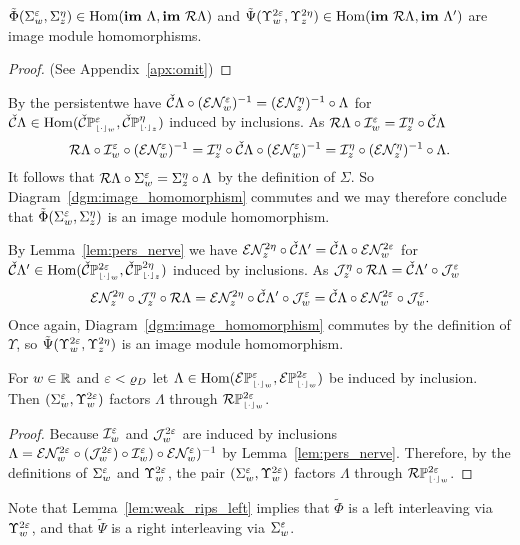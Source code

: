 \begin{lemma}\label{lem:rips_homomorphism_left}
  $\tilde{\Phi}(\Sigma_w^\e,\Sigma_z^\eta)\in\Hom(\im~\Lambda,\im~\rips\Lambda)$ and $\tilde{\Psi}(\Upsilon_w^{2\e},\Upsilon_z^{2\eta})\in\Hom(\im~\rips\Lambda,\im~\Lambda')$ are image module homomorphisms.
\end{lemma}
\begin{proof}
  (See Appendix~\ref{apx:omit})
\end{proof}
\proofatend
  By the persistentwe have $\cech\Lambda\circ (\E\N_w^\e)^{-1} = (\E\N_z^\eta)^{-1}\circ \Lambda$ for $\cech\Lambda\in\Hom(\CPP{w}{\e},\CPP{z}{\eta})$ induced by inclusions.
  As $\rips\Lambda\circ\I_w^\e = \I_z^\eta\circ\cech\Lambda$
  \[ \rips\Lambda\circ \I_w^\e\circ(\E\N_w^\e)^{-1} = \I_z^\eta\circ\cech\Lambda\circ (\E\N_w^\e)^{-1} = \I_z^\eta\circ (\E\N_z^\eta)^{-1}\circ\Lambda.\]
  It follows that $\rips\Lambda\circ\Sigma_w^\e = \Sigma_z^\eta\circ\Lambda$ by the definition of $\Sigma$.
  So Diagram~\ref{dgm:image_homomorphism} commutes and we may therefore conclude that $\tilde{\Phi}(\Sigma_w^\e,\Sigma_z^\eta)$ is an image module homomorphism.

  By Lemma~\ref{lem:pers_nerve} we have $\E\N_z^{2\eta} \circ\cech\Lambda'  = \cech \Lambda\circ \E\N_w^{2\e}$ for $\cech\Lambda'\in\Hom(\CPP{w}{2\e},\CPP{z}{2\eta})$ induced by inclusions.
  As $\J_z^\eta\circ \rips\Lambda = \cech\Lambda'\circ\J_w^\e$
  \[ \E\N_z^{2\eta}\circ \J_z^\eta\circ \rips\Lambda = \E\N_z^{2\eta}\circ\cech\Lambda'\circ\J_w^\e = \cech \Lambda\circ \E\N_w^{2\e}\circ\J_w^\e.\]
  Once again, Diagram~\ref{dgm:image_homomorphism} commutes by the definition of $\Upsilon$, so $\tilde{\Psi}(\Upsilon_w^{2\e},\Upsilon_z^{2\eta})$ is an image module homomorphism.
\endproofatend

\begin{lemma}\label{lem:weak_rips_left}
  For $w\in\R$ and $\e < \varrho_D$ let $\Lambda\in\Hom(\ext{\PP{w}{\e}}, \ext{\PP{w}{2\e}})$ be induced by inclusion.
  Then $(\Sigma_w^\e, \Upsilon_w^{2\e})$ factors $\Lambda$ through $\RPP{w}{2\e}$.
\end{lemma}
\begin{proof}
  Because $\I_w^\e$ and $\J_w^{2\e}$ are induced by inclusions $\Lambda = \E\N_w^{2\e}\circ (\J_w^{2\e})\circ \I_w^\e)\circ \E\N_w^\e)^{-1}$ by Lemma~\ref{lem:pers_nerve}.
  Therefore, by the definitions of $\Sigma_w^\e$ and $\Upsilon_w^{2\e}$, the pair $(\Sigma_w^\e, \Upsilon_w^{2\e})$ factors $\Lambda$ through $\RPP{w}{2\e}$.
\end{proof}

Note that Lemma~\ref{lem:weak_rips_left} implies that $\tilde{\Phi}$ is a left interleaving via $\Upsilon_w^{2\e}$, and that $\tilde{\Psi}$ is a right interleaving via $\Sigma_w^\e$.
